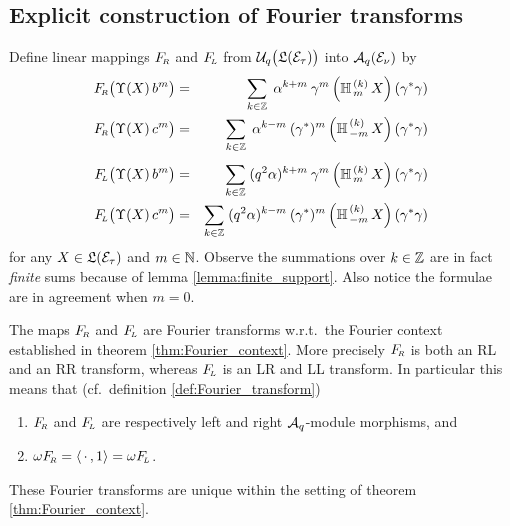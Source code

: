 \subsection{Explicit construction of Fourier transforms}

\begin{defn} \label{def:Eq2:Fourier_transforms}
Define linear mappings $F_{\!\scriptscriptstyle R}$ and $F_{\!\scriptscriptstyle L}$ from
$\Uq\!\left( \vertM \calL(\Hcore_\tau)\right)$ into ${\mathcal A}_q(\mathcal E_\nu)$ by
\begin{eqnarray*}
 \FRabb \!\left(\vertM\Upsilon(X)\, b^m\right)
    &=& \sum_{k\in\ZZ} \; \alpha^{k+m} \: \gamma^m
    \left(\YaH{m}{k}\,X\right)(\gamma^*\gamma) \\
\nopagebreak[4]
 \FRabb \!\left(\vertM\Upsilon(X)\, c^m\right)
    &=& \sum_{k\in\ZZ} \; \alpha^{k-m} \: (\gamma^*)^m
    \left(\YaH{-m}{k}\,X\right)(\gamma^*\gamma) \\
\nopagebreak[2]
    \vertXL
 \FLabb \!\left(\vertM\Upsilon(X)\, b^m\right)
    &=& \sum_{k\in\ZZ}  \; (q^2 \alpha)^{k+m}\: \gamma^m
    \left(\YaH{m}{k}\,X\right)(\gamma^*\gamma) \\
\nopagebreak[4]
 \FLabb \!\left(\vertM\Upsilon(X)\, c^m\right)
    &=& \sum_{k\in\ZZ}  \; (q^2 \alpha)^{k-m}\: (\gamma^*)^m
    \left(\YaH{-m}{k}\,X\right)(\gamma^*\gamma)
\end{eqnarray*}
for any $X\in \mathfrak{L}(\mathcal E_\tau)$ and $m\in \mathbb{N}$.
Observe the summations over $k\in\mathbb{Z}$ are in fact {\em finite\/} sums
because of lemma \ref{lemma:finite_support}. Also notice the
formulae are in agreement when $m=0$.
\end{defn}



\begin{prop} \label{prop:Eq2:Fourier_transforms}
The maps\/ $F_{\!\scriptscriptstyle R}$ and\/ $F_{\!\scriptscriptstyle L}$ are Fourier transforms w.r.t.\ the
Fourier context established in theorem \ref{thm:Fourier_context}\@.
More precisely\/ $F_{\!\scriptscriptstyle R}$ is both an {\scriptsize RL} and an {\scriptsize RR} transform,
whereas\/ $F_{\!\scriptscriptstyle L}$ is an {\scriptsize LR} and {\scriptsize LL} transform.
In particular this means that (cf.\ definition \ref{def:Fourier_transform})
\begin{enumerate}
\item
$F_{\!\scriptscriptstyle R}$ and\/ $F_{\!\scriptscriptstyle L}$ are respectively left and right\/ ${\mathcal A}_q$-module morphisms, and
\item
$\omega F_{\!\scriptscriptstyle R} = \langle \,\cdot\,,1 \rangle = \omega F_{\!\scriptscriptstyle L}$.
\end{enumerate}
These Fourier transforms are unique within the setting of theorem \ref{thm:Fourier_context}\@.
%
\end{prop}

